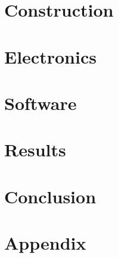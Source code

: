 \documentclass[11pt,openany]{book}
\newcommand{\cfbox}[2]{%
    \colorlet{currentcolor}{.}%
    {\color{#1}%
    \noindent\fbox{\vbox{\hsize\dimexpr\hsize-2\fboxsep\relax
    #2
    }}}%
}
\newcommand{\todo}[1]{\begin{center}\cfbox{red}{\textcolor{red}{Todo: #1}}\end{center}}
\begin{document}
    \chapter{Construction}\label{ch:construction}
    


    \chapter{Electronics}\label{ch:electronics}
    


    \chapter{Software}\label{ch:software}
    


    \chapter{Results}\label{ch:results}
    


    \chapter{Conclusion}\label{ch:conclusion}
    


    
    \printbibliography
%    


    \chapter{Appendix}\label{ch:appendix}
    
\end{document}
